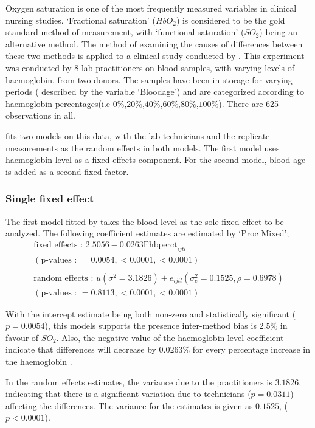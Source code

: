 \documentclass[12pt, a4paper]{report}
\theoremstyle{plain}
\theoremstyle{definition}
\theoremstyle{remark}
\begin{document}
		
		Oxygen saturation is one of the most frequently measured variables
		in clinical nursing studies. `Fractional saturation' ($HbO_{2}$)
		is considered to be the gold standard method of measurement, with
		`functional saturation' ($SO_{2}$) being an alternative method.
		The method of examining the causes of differences between these
		two methods is applied to a clinical study conducted by
		\citet{Shiao}. This experiment was conducted by 8 lab
		practitioners on blood samples, with varying levels of
		haemoglobin, from two donors. The samples have been in storage for
		varying periods ( described by the variable `Bloodage') and are
		categorized according to haemoglobin percentages(i.e
		$0\%$,$20\%$,$40\%$,$60\%$,$80\%$,$100\%$). There are 625
		observations in all.
		
		\citet{LaiShiao} fits two models on this data, with the lab
		technicians and the replicate measurements as the random effects
		in both models. The first model uses haemoglobin level as a fixed
		effects component. For the second model, blood age is added as a
		second fixed factor.
		
		\subsubsection{Single fixed effect} The first model fitted by \citet{LaiShiao} takes the
		blood level as the sole fixed effect to be analyzed. The following
		coefficient estimates are estimated by `Proc Mixed';
		\begin{eqnarray}
		\mbox{fixed effects :   } 2.5056 - 0.0263\mbox{Fhbperct}_{ijtl} \\
		(\mbox{p-values :   } = 0.0054, <0.0001, <0.0001)\nonumber\\\nonumber\\
		\mbox{random effects :   } u(\sigma^{2}=3.1826) + e_{ijtl}
		(\sigma^{2}_{e}=0.1525, \rho= 0.6978) \nonumber\\
		(\mbox{p-values :   } = 0.8113, <0.0001, <0.0001)\nonumber
		\end{eqnarray}
		
		With the intercept estimate being both non-zero and statistically
		significant ($p=0.0054$), this models supports the presence
		inter-method bias is $2.5\%$ in favour of $SO_{2}$. Also, the
		negative value of the haemoglobin level coefficient indicate that
		differences will decrease by $0.0263\%$ for every percentage
		increase in the haemoglobin .
		
		In the random effects estimates, the variance due to the
		practitioners is $3.1826$, indicating that there is a significant
		variation due to technicians ($p=0.0311$) affecting the
		differences. The variance for the estimates is given as $0.1525$,
		($p<0.0001$).
		
\end{document}
